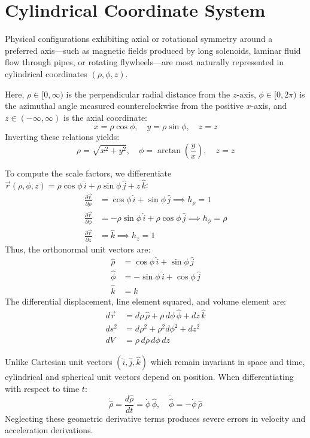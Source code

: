 \section{Cylindrical Coordinate System}
Physical configurations exhibiting axial or rotational symmetry around a preferred axis---such as magnetic fields produced by long solenoids, laminar fluid flow through pipes, or rotating flywheels---are most naturally represented in cylindrical coordinates $(\rho, \phi, z)$.

Here, $\rho \in [0, \infty)$ is the perpendicular radial distance from the $z$-axis, $\phi \in [0, 2\pi)$ is the azimuthal angle measured counterclockwise from the positive $x$-axis, and $z \in (-\infty, \infty)$ is the axial coordinate:
\begin{equation}
x = \rho\cos\phi, \quad y = \rho\sin\phi, \quad z = z
\end{equation}
Inverting these relations yields:
\begin{equation}
\rho = \sqrt{x^2 + y^2}, \quad \phi = \arctan\left(\frac{y}{x}\right), \quad z = z
\end{equation}

To compute the scale factors, we differentiate $\vec{r}(\rho, \phi, z) = \rho\cos\phi\,\hat{i} + \rho\sin\phi\,\hat{j} + z\,\hat{k}$:
\begin{align}
\frac{\partial \vec{r}}{\partial \rho} &= \cos\phi\,\hat{i} + \sin\phi\,\hat{j} \implies h_\rho = 1 \\
\frac{\partial \vec{r}}{\partial \phi} &= -\rho\sin\phi\,\hat{i} + \rho\cos\phi\,\hat{j} \implies h_\phi = \rho \\
\frac{\partial \vec{r}}{\partial z} &= \hat{k} \implies h_z = 1
\end{align}
Thus, the orthonormal unit vectors are:
\begin{align}
\hat{\rho} &= \cos\phi\,\hat{i} + \sin\phi\,\hat{j} \\
\hat{\phi} &= -\sin\phi\,\hat{i} + \cos\phi\,\hat{j} \\
\hat{k} &= \hat{k}
\end{align}
The differential displacement, line element squared, and volume element are:
\begin{align}
d\vec{r} &= d\rho\,\hat{\rho} + \rho\,d\phi\,\hat{\phi} + dz\,\hat{k} \\
ds^2 &= d\rho^2 + \rho^2 d\phi^2 + dz^2 \\
dV &= \rho\,d\rho\,d\phi\,dz
\end{align}

\begin{pitfallbox}
Unlike Cartesian unit vectors $(\hat{i}, \hat{j}, \hat{k})$ which remain invariant in space and time, cylindrical and spherical unit vectors depend on position. When differentiating with respect to time $t$:
\begin{equation}
\dot{\hat{\rho}} = \frac{d\hat{\rho}}{dt} = \dot{\phi}\,\hat{\phi}, \quad \dot{\hat{\phi}} = -\dot{\phi}\,\hat{\rho}
\end{equation}
Neglecting these geometric derivative terms produces severe errors in velocity and acceleration derivations.
\end{pitfallbox}


